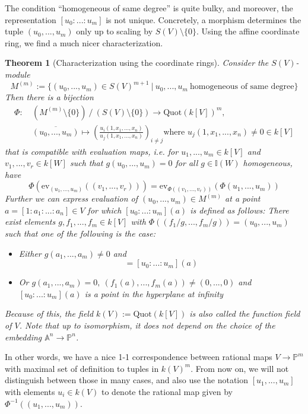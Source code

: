 \documentclass{scrartcl}
\newcommand{\I}{\mathbb{I}}
\newcommand{\Quot}{\mathrm{Quot}}
\newtheorem{theorem}[prop]{Theorem}
\theoremstyle{definition}
\begin{document}
The condition ``homogeneous of same degree'' is quite bulky, and moreover, the representation $[u_0 : ... : u_m]$ is not unique.
Concretely, a morphism determines the tuple $(u_0, ..., u_m)$ only up to scaling by $S(V) \setminus \{0\}$.
Using the affine coordinate ring, we find a much nicer characterization.
\begin{theorem}[Characterization using the coordinate rings]
    Consider the $S(V)$-module
    \begin{equation*}
        M^{(m)} := \{ (u_0, ..., u_m) \in S(V)^{m + 1} \ | \ u_0, ..., u_m \ \text{homogeneous of same degree} \}
    \end{equation*}
    Then there is a bijection
    \begin{align*}
        \Phi: \ &(M^{(m)} \setminus \{0\}) \ / \ (S(V) \setminus \{0\}) \to \Quot(k[V])^m, \\
        &\overline{(u_0, ..., u_m)} \mapsto \left( \frac {u_i(1, x_1, ..., x_n)} {u_j(1, x_1, ..., x_n)} \right)_{i \neq j} \text{where $u_j(1, x_1, ..., x_n) \neq 0 \in k[V]$}
    \end{align*}
    that is compatible with evaluation maps, i.e. for $u_1, ..., u_m \in k[V]$ and $v_1, ..., v_r \in k[W]$ such that $g(u_0, ..., u_m) = 0$ for all $g \in \I(W)$ homogeneous, have
    \begin{equation*}
        \Phi\left(\mathrm{ev}_{(u_1, ..., u_m)}((v_1, ..., v_r))\right) = \mathrm{ev}_{\Phi((v_1, ..., v_r))}\left(\Phi(u_1, ..., u_m)\right)
    \end{equation*}
    Further we can express evaluation of $(u_0, ..., u_m) \in M^{(m)}$ at a point $a = [1 : a_1 : ... : a_n] \in V$ for which $[u_0 : ... : u_m](a)$ is defined as follows:
    There exist elements $g, f_1, ..., f_m \in k[V]$ with $\Phi((f_1/g, ..., f_m/g)) = (u_0, ..., u_m)$ such that one of the following is the case:
    \begin{itemize}
        \item Either $g(a_1, ..., a_m) \neq 0$ and
        \begin{equation*}
            [1 : f_1(a)/g(a) : ... : f_m(a)/g(a)] = [u_0 : ... : u_m](a)
        \end{equation*}
        \item Or $g(a_1, ..., a_m) = 0, \ (f_1(a), ..., f_m(a)) \neq (0, ..., 0)$ and $[u_0 : ... : u_m](a)$ is a point in the hyperplane at infinity
    \end{itemize}
    Because of this, the field $k(V) := \Quot(k[V])$ is also called the function field of $V$. Note that up to isomorphism, it does not depend on the choice of the embedding $\mathbb{A}^n \to \mathbb{P}^n$.
\end{theorem}
In other words, we have a nice 1-1 correspondence between rational maps $V \to \mathbb{P}^m$ with maximal set of definition to tuples in $k(V)^m$.
From now on, we will not distinguish between those in many cases, and also use the notation $[u_1, ..., u_m]$ with elements $u_i \in k(V)$ to denote the rational map given by $\Phi^{-1}((u_1, ..., u_m))$.
\end{document}
